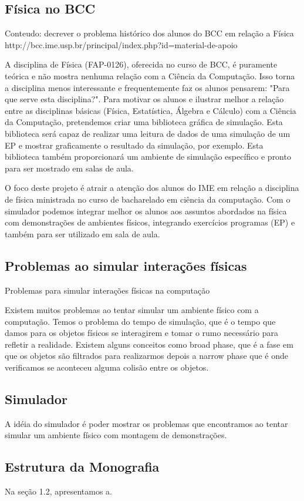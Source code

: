 
\subsection{Física no BCC}
    Conteudo: decrever o problema histórico dos alunos do BCC
               em relação a Física
               http://bcc.ime.usp.br/principal/index.php?id=material-de-apoio

A disciplina de Física (FAP-0126), oferecida no curso de BCC, é puramente teórica e não mostra nenhuma relação com a Ciência da Computação. Isso torna a disciplina menos interessante e frequentemente faz os alunos pensarem: "Para que serve esta disciplina?".
Para motivar os alunos e ilustrar melhor a relação entre as disciplinas básicas (Física, Estatística, Álgebra e Cálculo) com a Ciência da Computação, pretendemos criar uma biblioteca gráfica de simulação. Esta biblioteca será capaz de realizar uma leitura de dados de uma simulação de um EP e mostrar graficamente o resultado da simulação, por exemplo.
Esta biblioteca também proporcionará um ambiente de simulação específico e pronto para ser mostrado em salas de aula.

O foco deste projeto é atrair a atenção dos alunos do IME em relação a disciplina de física ministrada no curso de bacharelado em ciência da computação.
Com o simulador podemos integrar melhor os alunos aos assuntos abordados na física com demonstrações de ambientes físicos, 
integrando exercícios programas (EP) e também para ser utilizado em sala de aula.

\subsection{Problemas ao simular interações físicas}
    Problemas para simular interações físicas na computação

Existem muitos problemas ao tentar simular um ambiente físico com a computação. Temos o problema do tempo de simulação, 
que é o tempo que damos para os objetos físicos se interagirem e tomar o rumo necessário para refletir a realidade.
Existem alguns conceitos como broad phase, que é a fase em que os objetos são filtrados para realizarmos depois a narrow phase que é onde verificamos se aconteceu 
alguma colisão entre os objetos.

\subsection{Simulador}

A idéia do simulador é poder mostrar os problemas que encontramos ao tentar simular um ambiente físico com montagem de demonstrações. 

\subsection{Estrutura da Monografia}

Na seção 1.2, apresentamos a.
